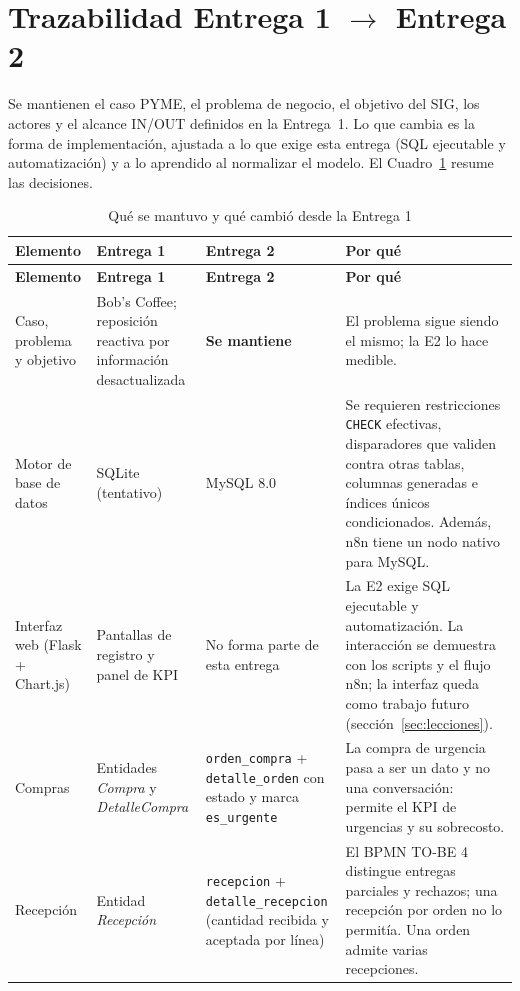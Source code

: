 \documentclass[11pt,letterpaper]{article}
\newcommand{\tablasize}{\footnotesize}
\begin{document}
\newpage
\section{Trazabilidad Entrega 1 $\rightarrow$ Entrega 2}
\label{sec:traza}

Se mantienen el caso PYME, el problema de negocio, el objetivo del SIG, los actores y el alcance IN/OUT definidos en la Entrega~1. Lo que cambia es la forma de implementación, ajustada a lo que exige esta entrega (SQL ejecutable y automatización) y a lo aprendido al normalizar el modelo. El Cuadro~\ref{tab:traza} resume las decisiones.

{\tablasize
\begin{longtable}{>{\raggedright\arraybackslash}p{2.6cm}>{\raggedright\arraybackslash}p{3.4cm}>{\raggedright\arraybackslash}p{3.6cm}>{\raggedright\arraybackslash}p{5.2cm}}
\caption{Qué se mantuvo y qué cambió desde la Entrega 1}\label{tab:traza}\\
\toprule
\textbf{Elemento} & \textbf{Entrega 1} & \textbf{Entrega 2} & \textbf{Por qué} \\ \midrule \endfirsthead
\toprule
\textbf{Elemento} & \textbf{Entrega 1} & \textbf{Entrega 2} & \textbf{Por qué} \\ \midrule \endhead
Caso, problema y objetivo & Bob's Coffee; reposición reactiva por información desactualizada & \textbf{Se mantiene} & El problema sigue siendo el mismo; la E2 lo hace medible. \\
Motor de base de datos & SQLite (tentativo) & MySQL 8.0 & Se requieren restricciones \texttt{CHECK} efectivas, disparadores que validen contra otras tablas, columnas generadas e índices únicos condicionados. Además, n8n tiene un nodo nativo para MySQL. \\
Interfaz web (Flask + Chart.js) & Pantallas de registro y panel de KPI & No forma parte de esta entrega & La E2 exige SQL ejecutable y automatización. La interacción se demuestra con los scripts y el flujo n8n; la interfaz queda como trabajo futuro (sección~\ref{sec:lecciones}). \\
Compras & Entidades \emph{Compra} y \emph{DetalleCompra} & \texttt{orden\_compra} + \texttt{detalle\_orden} con estado y marca \texttt{es\_urgente} & La compra de urgencia pasa a ser un dato y no una conversación: permite el KPI de urgencias y su sobrecosto. \\
Recepción & Entidad \emph{Recepción} & \texttt{recepcion} + \texttt{detalle\_recepcion} (cantidad recibida y aceptada por línea) & El BPMN TO-BE 4 distingue entregas parciales y rechazos; una recepción por orden no lo permitía. Una orden admite varias recepciones. \\

\end{longtable}}
\end{document}
